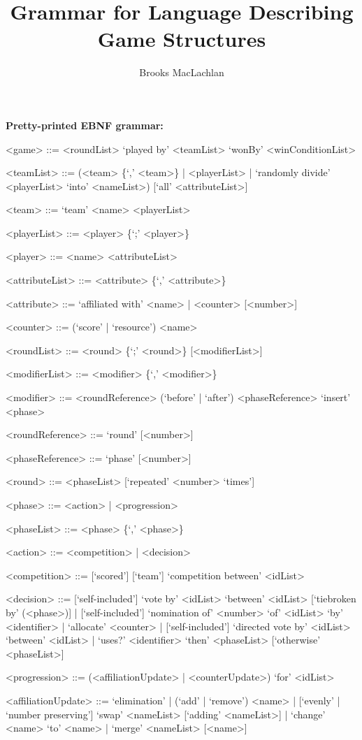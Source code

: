 \documentclass{article}
\title{Grammar for Language Describing Game Structures}
\author{Brooks MacLachlan}
\begin{document}
\maketitle

\noindent \textbf{Pretty-printed EBNF grammar:}
\begin{grammar}
<game> ::= <roundList> `played by' <teamList> `wonBy' <winConditionList>

<teamList> ::= (<team> \{`,' <team>\} | <playerList> | `randomly divide' 
<playerList> `into' <nameList>) [`all' <attributeList>]

<team> ::= `team' <name> <playerList>

<playerList> ::= <player> \{`;' <player>\}

<player> ::= <name> <attributeList>

<attributeList> ::= <attribute> \{`,' <attribute>\}

<attribute> ::= `affiliated with' <name> | <counter> [<number>]

<counter> ::= (`score' | `resource') <name>

<roundList> ::= <round> \{`;' <round>\} [<modifierList>]

<modifierList> ::= <modifier> \{`,' <modifier>\}

<modifier> ::= <roundReference> (`before' | `after') <phaseReference> `insert' 
<phase>

<roundReference> ::= `round' [<number>]

<phaseReference> ::= `phase' [<number>]

<round> ::= <phaseList> [`repeated' <number> `times']

<phase> ::= <action> | <progression>

<phaseList> ::= <phase> \{`,' <phase>\}

<action> ::= <competition> | <decision>

<competition> ::= [`scored'] [`team'] `competition between' <idList>

<decision> ::= [`self-included'] `vote by' <idList> `between' <idList> 
[`tiebroken by' 
(<phase>)] | [`self-included'] `nomination of' <number> 
`of' <idList> `by' <identifier> | `allocate' <counter> | [`self-included'] 
`directed vote by' <idList> `between' <idList> | `uses?' <identifier> `then' 
<phaseList> [`otherwise' <phaseList>]

<progression> ::= (<affiliationUpdate> | <counterUpdate>) 
`for' <idList>

<affiliationUpdate> ::= `elimination' | (`add' | `remove') <name> | 
[`evenly' | `number preserving'] `swap' <nameList> [`adding' 
<nameList>] | `change' <name> `to' <name> | `merge' 
<nameList> [<name>]


\end{grammar}
\end{document}

